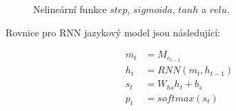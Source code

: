 \begin{figure}[H]
    \begin{center}
    \end{center}
	\caption{Nelineární funkce $step$, $sigmoida$, $tanh$ a $relu$.}
	\label{img:functions}
\end{figure}

Rovnice pro RNN jazykový model jsou následující:

\begin{align}
  m_{t}&=M_{e_{t-1}}\label{figure:lastContext} \\
  h_{t}&=RNN(m_t, h_{t-1}) \label{figure:rnnSimple} \\
  s_{t}&=W_{hs}h_t + b_s \label{figure:rnnSt} \\
  p_{t}&=softmax(s_t) \label{figure:rnnSoftmax}
\end{align}


